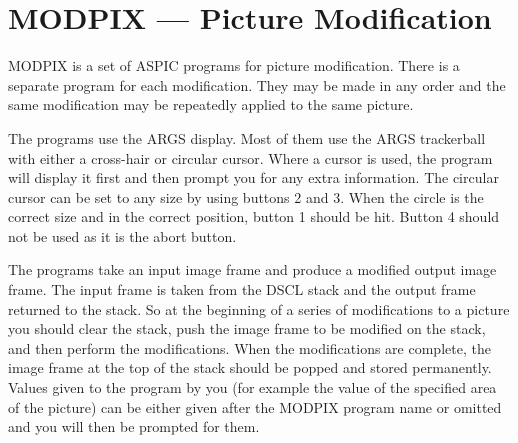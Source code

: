 \section {MODPIX --- Picture Modification}

MODPIX is a set of ASPIC programs for picture modification.
There is a separate program for each modification.
They may be made in any order and the same modification may be repeatedly
applied to the same picture.

The programs use the ARGS display.
Most of them use the ARGS trackerball with either a cross-hair or circular
cursor.
Where a cursor is used, the program will display it first and then prompt you
for any extra information.
The circular cursor can be set to any size by using buttons 2 and 3.
When the circle is the correct size and in the correct position, button 1 should
be hit.
Button 4 should not be used as it is the abort button.

The programs take an input image frame and produce a modified output image
frame.
The input frame is taken from the DSCL stack and the output frame returned to
the stack.
So at the beginning of a series of modifications to a picture you should clear
the stack, push the image frame to be modified on the stack, and then perform
the modifications.
When the modifications are complete, the image frame at the top of the stack
should be popped and stored permanently.
Values given to the program by you (for example the value of the specified area
of the picture) can be either given after the MODPIX program name or omitted and
you will then be prompted for them.
